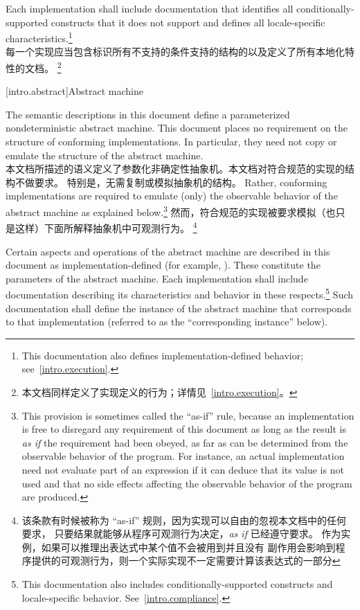 \pnum
Each implementation shall include documentation that identifies all
conditionally-supported constructs
that it does not support and defines all locale-specific characteristics.\footnote{This documentation also defines implementation-defined behavior;
see~\ref{intro.execution}.} \\
每一个实现应当包含标识所有不支持的条件支持的结构的以及定义了所有本地化特性的文档。
\footnote{本文档同样定义了实现定义的行为；详情见~\ref{intro.execution}。}
%
%

[intro.abstract]{Abstract machine}

\pnum
{}%
%
The semantic descriptions in this document define a
parameterized nondeterministic abstract machine. This document
places no requirement on the structure of conforming
implementations. In particular, they need not copy or emulate the
structure of the abstract machine. \\
本文档所描述的语义定义了参数化非确定性抽象机。本文档对符合规范的实现的结构不做要求。
特别是，无需复制或模拟抽象机的结构。
%
%
Rather, conforming implementations are required to emulate (only) the observable
behavior of the abstract machine as explained below.\footnote{This provision is
sometimes called the ``as-if'' rule, because an implementation is free to
disregard any requirement of this document as long as the result
is \emph{as if} the requirement had been obeyed, as far as can be determined
from the observable behavior of the program. For instance, an actual
implementation need not evaluate part of an expression if it can deduce that its
value is not used and that no
%
side effects affecting the
observable behavior of the program are produced.}
然而，符合规范的实现被要求模拟（也只是这样）下面所解释抽象机中可观测行为。
\footnote{该条款有时候被称为 ``as-if'' 规则，因为实现可以自由的忽视本文档中的任何要求，
只要结果就能够从程序可观测行为决定，\emph{as if} 已经遵守要求。
作为实例，如果可以推理出表达式中某个值不会被用到并且没有 %
副作用会影响到程序提供的可观测行为，则一个实际实现不一定需要计算该表达式的一部分}

%
\pnum
Certain aspects and operations of the abstract machine are described in this
document as implementation-defined (for example,
). These constitute the parameters of the abstract machine.
Each implementation shall include documentation describing its characteristics
and behavior in these respects.\footnote{This documentation also includes
conditionally-supported constructs and locale-specific behavior.
See~\ref{intro.compliance}.} Such documentation shall define the instance of the
abstract machine that corresponds to that implementation (referred to as the
``corresponding instance'' below).

